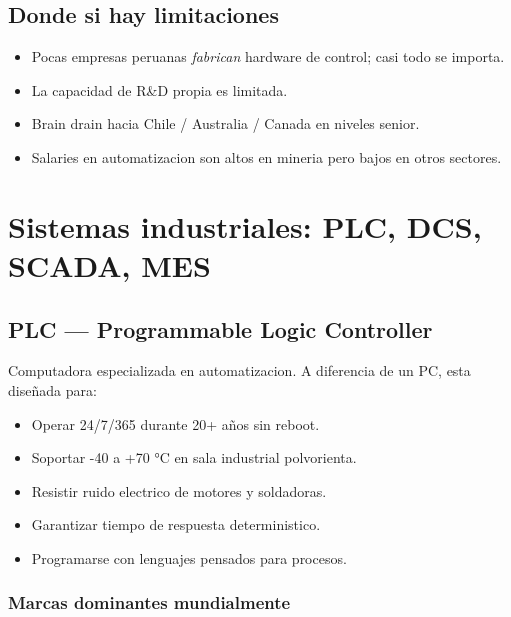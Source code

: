 \documentclass[11pt,a4paper,oneside]{report}
\begin{document}
\section{Donde si hay limitaciones}

\begin{itemize}[leftmargin=2em]
  \item Pocas empresas peruanas \emph{fabrican} hardware de control;
        casi todo se importa.
  \item La capacidad de R\&D propia es limitada.
  \item Brain drain hacia Chile / Australia / Canada en niveles senior.
  \item Salaries en automatizacion son altos en mineria pero bajos en
        otros sectores.
\end{itemize}

\chapter{Sistemas industriales: PLC, DCS, SCADA, MES}

\section{PLC --- Programmable Logic Controller}

Computadora especializada en automatizacion. A diferencia de un PC, esta
diseñada para:

\begin{itemize}[leftmargin=2em]
  \item Operar 24/7/365 durante 20+ años sin reboot.
  \item Soportar -40 a +70 °C en sala industrial polvorienta.
  \item Resistir ruido electrico de motores y soldadoras.
  \item Garantizar tiempo de respuesta deterministico.
  \item Programarse con lenguajes pensados para procesos.
\end{itemize}

\subsection{Marcas dominantes mundialmente}
\end{document}
